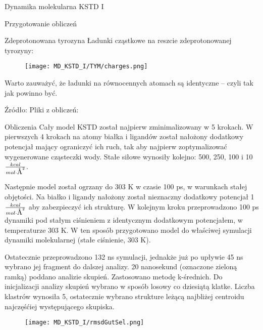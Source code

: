 \begin{section}{Dynamika molekularna KSTD I}
\begin{subsection}{Przygotowanie obliczeń}
\begin{subsubsection}{Zdeprotonowana tyrozyna}
Ładunki cząstkowe na reszcie zdeprotonowanej tyrozyny:
\begin{figure}[H]
  \texttt{[image: MD\_KSTD\_I/TYM/charges.png]}
\end{figure}

Warto zauważyć, że ładunki na równocennych atomach są identyczne -- czyli tak jak powinno być.

Źródło: 
Pliki z obliczeń:

\end{subsubsection}

 
\end{subsection}

\begin{subsection}{Obliczenia}
Cały model KSTD został najpierw zminimalizowany w 5 krokach. W pierwszych 4 krokach na atomy białka i ligandów został nałożony dodatkowy potencjał mający ograniczyć ich ruch, 
tak aby najpierw zoptymalizować wygenerowane cząsteczki wody. Stałe siłowe wynosiły kolejno: 500, 250, 100 i 10 $\frac{kcal}{mol \cdot \mbox{\normalfont\AA}^2 }$.

Następnie model został ogrzany do 303 K w czasie 100 ps, w warunkach stałej objętości. Na białko i ligandy nałożony został nieznaczny dodatkowy potencjał
1 $\frac{kcal}{mol \cdot \mbox{\normalfont\AA}^2 }$ aby zabezpieczyć ich strukturę. W kolejnym kroku przeprowadzono 100 ps dynamiki pod stałym ciśnieniem z identycznym dodatkowym potencjałem, w 
temperaturze 303 K. W ten sposób przygotowano model do właściwej symulacji dynamiki molekularnej (stałe ciśnienie, 303 K).

Ostatecznie przeprowadzono 132 ns symulacji, jednakże już po upływie 45 ns wybrano jej fragment do dalszej analizy. 20 nanosekund (oznaczone zieloną ramką) poddano analizie skupień.
Zastosowano metodę k-średnich. Do inicjalizacji analizy skupień wybrano w sposób losowy co dziesiątą klatke. 
Liczba klastrów wynosiła 5, ostatecznie wybrano strukture leżącą najbliżej centroidu najczęśćiej występującego skupiska.



\begin{figure}[H]
  \texttt{[image: MD\_KSTD\_I/rmsdGutSel.png]}
\end{figure}

\end{subsection}

\end{section}